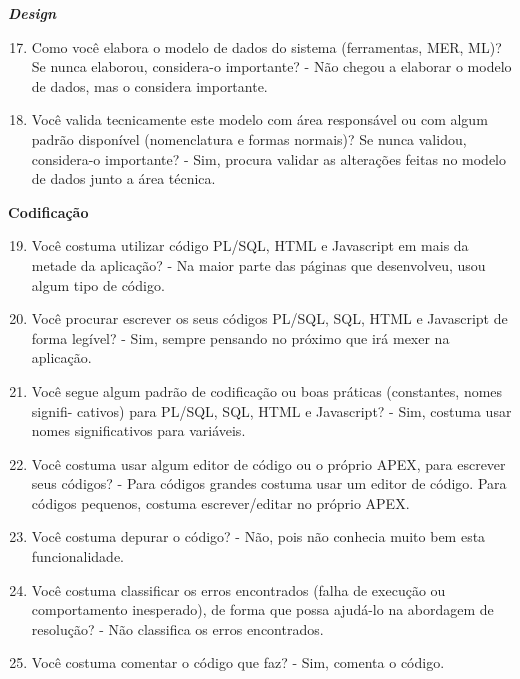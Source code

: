 \begin{anexosenv}
\textbf{\textit{Design}}

\begin{enumerate}
\setcounter{enumi}{16}
\item Como você elabora o modelo de dados do sistema (ferramentas, MER, ML)? Se nunca
elaborou, considera-o importante?\newline
- Não chegou a elaborar o modelo de dados, mas o considera importante.
\item Você valida tecnicamente este modelo com área responsável ou com algum padrão
disponível (nomenclatura e formas normais)? Se nunca validou, considera-o importante?\newline
- Sim, procura validar as alterações feitas no modelo de dados junto a área técnica.
\end{enumerate}

\textbf{Codificação}

\begin{enumerate}
\setcounter{enumi}{18}
\item Você costuma utilizar código PL/SQL, HTML e Javascript em mais da metade da
aplicação?\newline
- Na maior parte das páginas que desenvolveu, usou algum tipo de código.
\item Você procurar escrever os seus códigos PL/SQL, SQL, HTML e Javascript de forma
legível?\newline
- Sim, sempre pensando no próximo que irá mexer na aplicação.
\item Você segue algum padrão de codificação ou boas práticas (constantes, nomes signifi-
cativos) para PL/SQL, SQL, HTML e Javascript?\newline
- Sim, costuma usar nomes significativos para variáveis.
\item Você costuma usar algum editor de código ou o próprio APEX, para escrever seus
códigos?\newline
- Para códigos grandes costuma usar um editor de código. Para códigos pequenos, costuma escrever/editar no próprio APEX.
\item Você costuma depurar o código?\newline
- Não, pois não conhecia muito bem esta funcionalidade.
\item Você costuma classificar os erros encontrados (falha de execução ou comportamento
inesperado), de forma que possa ajudá-lo na abordagem de resolução?\newline
- Não classifica os erros encontrados.
\item Você costuma comentar o código que faz?\newline
- Sim, comenta o código.
\end{enumerate}


\end{anexosenv}
